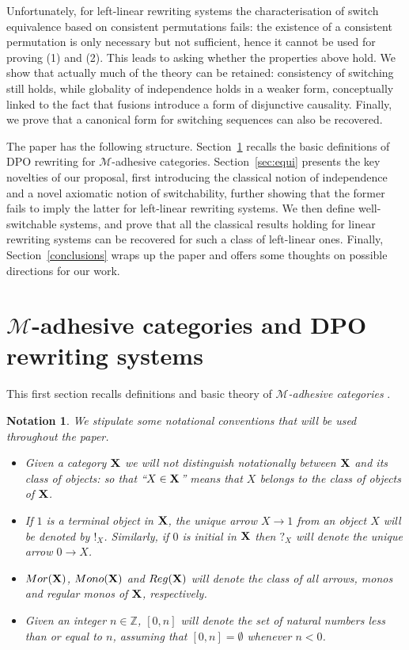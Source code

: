 \documentclass[a4paper,UKenglish,cleveref,pdftex,thm-restate,numberwithinsect,anonymous]{lipics}
\newcommand{\mor}{\mathsf{Mor}}
\newcommand{\mon}{\mathsf{Mono}}
\newcommand{\reg}{\mathsf{Reg}}
\def\X{\textbf {\textup{X}}}
\def\Set{\textbf {\textup{Set}}}
\newtheorem*{notation}{Notation}
\begin{document}
Unfortunately, for left-linear rewriting systems the characterisation
of switch equivalence based on consistent permutations fails: the
existence of a consistent permutation is only necessary but not
sufficient, hence it cannot be used for proving (1) and (2).
%
This leads to asking whether the properties above hold.
We show that actually much of the theory can be retained: consistency
of switching still holds, while globality of independence holds in a
weaker form, conceptually linked to the fact that fusions introduce a
form of disjunctive causality. Finally, we prove that a canonical form
for switching sequences can also be recovered.

The paper has the following structure. 
Section~\ref{sec:ade} recalls the basic 
definitions of DPO rewriting for $\mathcal{M}$-adhesive categories. 
Section~\ref{sec:equi} presents the key novelties of our proposal,
first introducing the classical notion of independence and 
a novel axiomatic notion of switchability, further showing that the
former fails to imply the latter for left-linear rewriting systems.
We then define well-switchable systems,
and prove that all the classical results holding for linear rewriting systems
can be recovered for such a class of left-linear ones.
Finally, Section~\ref{conclusions} wraps up the paper and 
offers some thoughts on possible directions for our work.

\section{$\mathcal{M}$-adhesive categories and DPO rewriting systems}\label{sec:ade}
This first section recalls definitions and basic theory of \emph{$\mathcal{M}$-adhesive categories} \cite{azzi2019essence,ehrig2012,ehrig2014adhesive,lack2005adhesive,heindel2009category}.

\begin{notation}
  We stipulate some notational conventions that will be used
  throughout the paper.
  \begin{itemize}
  \item
    Given a category $\X$ we will not distinguish notationally
    between $\X$ and its class of objects: so that ``$X\in \X$'' means
    that $X$ belongs to the class of objects of $\X$.

  \item
    If $1$ is a terminal object in $\X$, the unique
    arrow $X\to 1$ from an object $X$ will be denoted by
    $!_X$. Similarly, if $0$ is initial in $\X$ then $?_X$ will denote
    the unique arrow $0\to
    X$. %

  \item $\mor(\X)$, $\mon(\X)$ and $\reg(\X)$ will denote the class of
    all arrows, monos and regular monos of $\X$, respectively.

  \item Given an integer $n\in \mathbb{Z}$, $[0,n]$ will denote the
    set of natural numbers less than or equal to $n$, assuming that
    $[0,n]=\emptyset$ whenever $n<0$.
  \end{itemize}
\end{notation}
\end{document}
